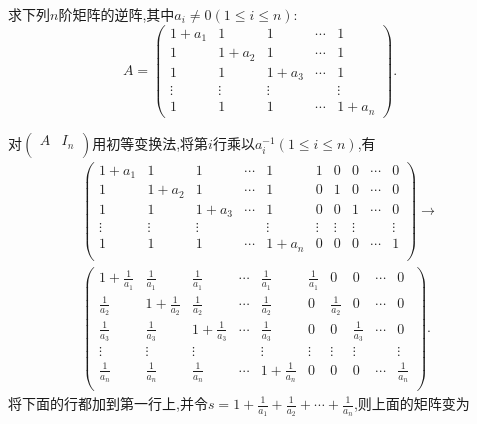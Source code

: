 \documentclass[lang=cn,newtx,10pt,scheme=chinese]{elegantbook}
\begin{document}
\begin{exercise}\label{exercise2.3}
求下列\(n\)阶矩阵的逆阵,其中\(a_i \neq 0(1\leq i\leq n)\):
\[
A = 
\begin{pmatrix}
1 + a_1 & 1 & 1 & \cdots & 1 \\
1 & 1 + a_2 & 1 & \cdots & 1 \\
1 & 1 & 1 + a_3 & \cdots & 1 \\
\vdots & \vdots & \vdots & & \vdots \\
1 & 1 & 1 & \cdots & 1 + a_n
\end{pmatrix}.
\]
\end{exercise}
\begin{solution}
对\(\left( \begin{matrix}
A&		I_n\\
\end{matrix} \right) \)用初等变换法,将第\(i\)行乘以\(a_i^{-1}(1\leq i\leq n)\),有
\begin{gather*}
\left( \begin{matrix}
1+a_1&		1&		1&		\cdots&		1&		1&		0&		0&		\cdots&		0\\
1&		1+a_2&		1&		\cdots&		1&		0&		1&		0&		\cdots&		0\\
1&		1&		1+a_3&		\cdots&		1&		0&		0&		1&		\cdots&		0\\
\vdots&		\vdots&		\vdots&		&		\vdots&		\vdots&		\vdots&		\vdots&		&		\vdots\\
1&		1&		1&		\cdots&		1+a_n&		0&		0&		0&		\cdots&		1\\
\end{matrix} \right) \rightarrow 
\\
\left( \begin{matrix}
1+\frac{1}{a_1}&		\frac{1}{a_1}&		\frac{1}{a_1}&		\cdots&		\frac{1}{a_1}&		\frac{1}{a_1}&		0&		0&		\cdots&		0\\
\frac{1}{a_2}&		1+\frac{1}{a_2}&		\frac{1}{a_2}&		\cdots&		\frac{1}{a_2}&		0&		\frac{1}{a_2}&		0&		\cdots&		0\\
\frac{1}{a_3}&		\frac{1}{a_3}&		1+\frac{1}{a_3}&		\cdots&		\frac{1}{a_3}&		0&		0&		\frac{1}{a_3}&		\cdots&		0\\
\vdots&		\vdots&		\vdots&		&		\vdots&		\vdots&		\vdots&		\vdots&		&		\vdots\\
\frac{1}{a_n}&		\frac{1}{a_n}&		\frac{1}{a_n}&		\cdots&		1+\frac{1}{a_n}&		0&		0&		0&		\cdots&		\frac{1}{a_n}\\
\end{matrix} \right) .
\end{gather*}
将下面的行都加到第一行上,并令\(s = 1 + \frac{1}{a_1} + \frac{1}{a_2} + \cdots + \frac{1}{a_n}\),则上面的矩阵变为

\end{solution}
\end{document}
